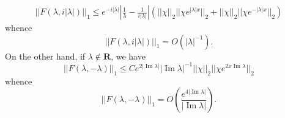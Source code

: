 \documentclass[12pt]{report}
\newcommand{\RR}{\mathbf{R}}
\renewcommand{\Im}{\operatorname{Im}}
\theoremstyle{definition}
\begin{document}
\begin{align*}
||F(\lambda, i|\lambda|)||_1 \leq e^{-i|\lambda|}\left|\frac{1}{\lambda} - \frac{1}{i|\lambda|}\right|(||\chi||_2 ||\chi e^{|\lambda| x}||_2 + ||\chi||_2 ||\chi e^{-|\lambda|x}||_2)
\end{align*}
whence
\begin{equation}
\label{estimate on F}
||F(\lambda, i|\lambda|)||_1 = O(|\lambda|^{-1}).
\end{equation}
On the other hand, if $\lambda \notin \RR$, we have
$$||F(\lambda, -\lambda)||_1 \leq Ce^{2|\Im \lambda|}|\Im \lambda|^{-1}||\chi||_2||\chi e^{2x\Im \lambda}||_2$$
whence
\begin{equation}
  \label{imaginary estimate on F}
  ||F(\lambda, -\lambda)||_1 = O\left(\frac{e^{4 |\Im \lambda|}}{|\Im \lambda|}\right).
\end{equation}
\end{document}
